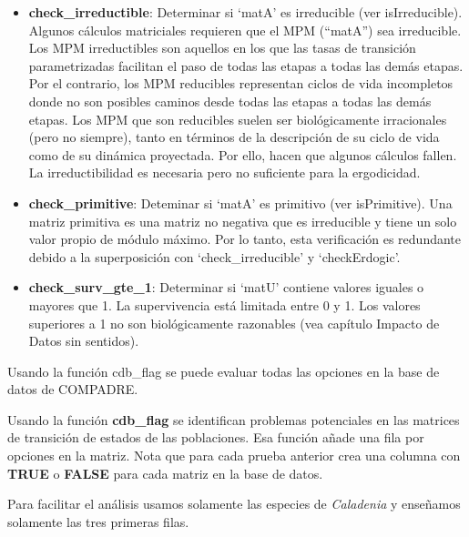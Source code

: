 \documentclass[
  12pt,
  letterpaper,
]{book}
\begin{document}
\begin{itemize}
\item
  \textbf{check\_irreductible}: Determinar si `matA' es irreducible (ver
  isIrreducible). Algunos cálculos matriciales requieren que el MPM
  (``matA'') sea irreducible. Los MPM irreductibles son aquellos en los
  que las tasas de transición parametrizadas facilitan el paso de todas
  las etapas a todas las demás etapas. Por el contrario, los MPM
  reducibles representan ciclos de vida incompletos donde no son
  posibles caminos desde todas las etapas a todas las demás etapas. Los
  MPM que son reducibles suelen ser biológicamente irracionales (pero no
  siempre), tanto en términos de la descripción de su ciclo de vida como
  de su dinámica proyectada. Por ello, hacen que algunos cálculos
  fallen. La irreductibilidad es necesaria pero no suficiente para la
  ergodicidad.
\item
  \textbf{check\_primitive}: Deteminar si `matA' es primitivo (ver
  isPrimitive). Una matriz primitiva es una matriz no negativa que es
  irreducible y tiene un solo valor propio de módulo máximo. Por lo
  tanto, esta verificación es redundante debido a la superposición con
  `check\_irreducible' y `checkErdogic'.
\item
  \textbf{check\_surv\_gte\_1}: Determinar si `matU' contiene valores
  iguales o mayores que 1. La supervivencia está limitada entre 0 y 1.
  Los valores superiores a 1 no son biológicamente razonables (vea
  capítulo Impacto de Datos sin sentidos).
\end{itemize}

Usando la función cdb\_flag se puede evaluar todas las opciones en la
base de datos de COMPADRE.

Usando la función \textbf{cdb\_flag} se identifican problemas
potenciales en las matrices de transición de estados de las poblaciones.
Esa función añade una fila por opciones en la matriz. Nota que para cada
prueba anterior crea una columna con \textbf{TRUE} o \textbf{FALSE} para
cada matriz en la base de datos.

Para facilitar el análisis usamos solamente las especies de
\emph{Caladenia} y enseñamos solamente las tres primeras filas.
\end{document}
